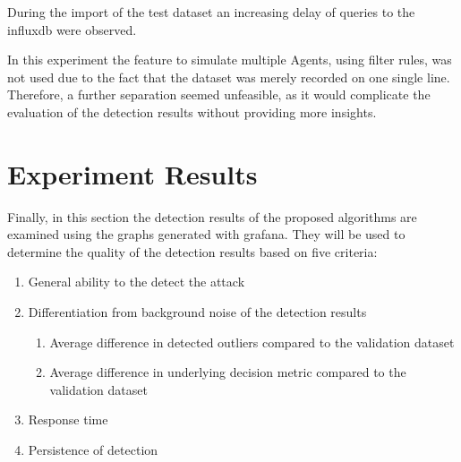 During the import of the test dataset an increasing delay of queries to the \gls{influxdb} were observed.


In this experiment the feature to simulate multiple Agents, using filter rules, was not used due to the fact that the dataset was merely recorded on one single line. Therefore, a further separation seemed unfeasible, as it would complicate the evaluation of the detection results without providing more insights.

\section{Experiment Results}
\label{sec:results:results}

Finally, in this section the detection results of the proposed algorithms are examined using the graphs generated with \gls{grafana}. They will be used to determine the quality of the detection results based on five criteria:

\begin{enumerate}
	\item General ability to the detect the attack
	\item Differentiation from background noise of the detection results
	\begin{enumerate}
		\item Average difference in detected outliers compared to the validation dataset
		\item Average difference in underlying decision metric compared to the validation dataset
	\end{enumerate}
	\item Response time 
	\item Persistence of detection
\end{enumerate}

